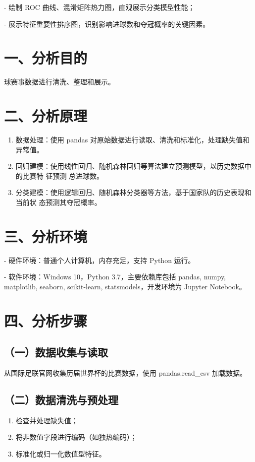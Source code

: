 \documentclass[UTF8]{ctexart}
\begin{document}
	- 绘制 ROC 曲线、混淆矩阵热力图，直观展示分类模型性能；
	
	- 展示特征重要性排序图，识别影响进球数和夺冠概率的关键因素。
	
	
	\section*{一、分析目的}
	球赛事数据进行清洗、整理和展示。
	
	\section*{二、分析原理}
	\begin{enumerate}
		\item 数据处理：使用 pandas 对原始数据进行读取、清洗和标准化，处理缺失值和异常值。
		\item 回归建模：使用线性回归、随机森林回归等算法建立预测模型，以历史数据中的比赛特
		征预测 总进球数。
		\item 分类建模：使用逻辑回归、随机森林分类器等方法，基于国家队的历史表现和当前状
		态预测其夺冠概率。
	\end{enumerate}
	
	\section*{三、分析环境}
	
	
	- 硬件环境：普通个人计算机，内存充足，支持 Python 运行。
	
	- 软件环境：Windows 10，Python 3.7，主要依赖库包括 pandas, numpy, matplotlib,
	seaborn, scikit-learn, statsmodels，开发环境为 Jupyter Notebook。
	
	
	\section*{四、分析步骤}
	
	\subsection*{（一）数据收集与读取}
	从国际足联官网收集历届世界杯的比赛数据，使用 pandas.read\_csv 加载数据。
	
	\subsection*{（二）数据清洗与预处理}
	\begin{enumerate}
		\item 检查并处理缺失值；
		\item 将非数值字段进行编码（如独热编码）；
		\item 标准化或归一化数值型特征。
	\end{enumerate}
	
\end{document}
